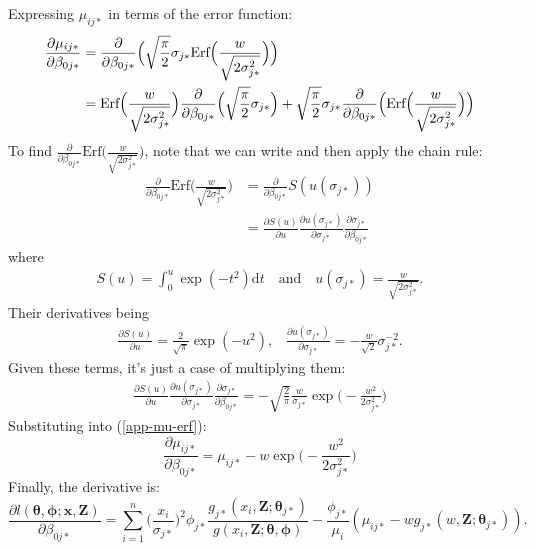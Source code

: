 \documentclass[useAMS,referee]{biom}
\begin{document}
Expressing $\mu_{ij*}$ in terms of the error function:
\begin{align}
\frac{\partial \mu_{ij*}}{\partial \beta_{0j*}} &= \frac{\partial}{\partial \beta_{0j*}} \Big( \sqrt{\frac{\pi}{2}} \sigma_{j*} \text{Erf}\Big(\frac{w}{\sqrt{2\sigma_{j*}^2}}\Big) \Big) \notag \\
&= \text{Erf}\Big(\frac{w}{\sqrt{2\sigma_{j*}^2}}\Big) \frac{\partial}{\partial \beta_{0j*}} \Big( \sqrt{\frac{\pi}{2}} \sigma_{j*} \Big) + \sqrt{\frac{\pi}{2}} \sigma_{j*} \frac{\partial}{\partial \beta_{0j*}} \Big(\text{Erf}\Big(\frac{w}{\sqrt{2\sigma_{j*}^2}}\Big) \Big)\label{app-mu-erf}
\end{align}
To find $\frac{\partial}{\partial \beta_{0j*}} \text{Erf}\Big(\frac{w}{\sqrt{2\sigma_{j*}^2}}\Big)$, note that we can write and then apply the chain rule:
\begin{align*}
\frac{\partial}{\partial \beta_{0j*}} \text{Erf}\Big(\frac{w}{\sqrt{2\sigma_{j*}^2}}\Big) &= \frac{\partial}{\partial \beta_{0j*}} S(u(\sigma_{j*}))\\
&= \frac{\partial S(u)}{\partial u} \frac{\partial u(\sigma_{j*})}{\partial \sigma_{j*} } \frac{\partial \sigma_{j*}}{\partial \beta_{0j*}}
\end{align*}
where 
\begin{align*}
S(u) = \int_0^{u} \exp(-t^2) \text{d}t \quad \text{and} \quad u(\sigma_{j*})=\frac{w}{\sqrt{2\sigma_{j*}^2}}.
\end{align*}
Their derivatives being
\begin{align*}
\frac{\partial S(u)}{\partial u} = \frac{2}{\sqrt{\pi}} \exp(-u^2) \text{,} \quad \frac{\partial u(\sigma_{j*})}{\partial \sigma_{j*}} = -\frac{w}{\sqrt{2}}\sigma_{j*}^{-2}.
\end{align*}
Given these terms, it's just a case of multiplying them:
\begin{align*}
\frac{\partial S(u)}{\partial u} \frac{\partial u(\sigma_{j*})}{\partial \sigma_{j*} } \frac{\partial \sigma_{j*}}{\partial \beta_{0j*}} = - \sqrt{\frac{2}{\pi}} \frac{w}{\sigma_{j*}} \exp\Big( -\frac{w^2}{2\sigma_{j*}^2} \Big)
\end{align*}
Substituting into (\ref{app-mu-erf}):
\begin{equation*}
\frac{\partial \mu_{ij*}}{\partial \beta_{0j*}} =  \mu_{ij*} - w \exp\Big( -\frac{w^2}{2\sigma_{j*}^2} \Big)
\end{equation*}
Finally, the derivative is:
\begin{equation*}
\frac{\partial l(\bm{\theta}, \bm{\phi}; \mathbf{x},\mathbf{Z})}{\partial \beta_{0j*}} = \sum_{i=1}^n \Big( \frac{x_i}{\sigma_{j*}}\Big)^2 \phi_{j*} \frac{g_{j*}(x_i,\mathbf{Z}; \bm{\theta}_{j*})}{g(x_i,\mathbf{Z}; \bm{\theta},\bm{\phi})}  - \frac{\phi_{j*}}{\mu_i} (\mu_{ij*} - w g_{j*}(w,\mathbf{Z}; \bm{\theta}_{j*})).
\end{equation*}
\end{document}

